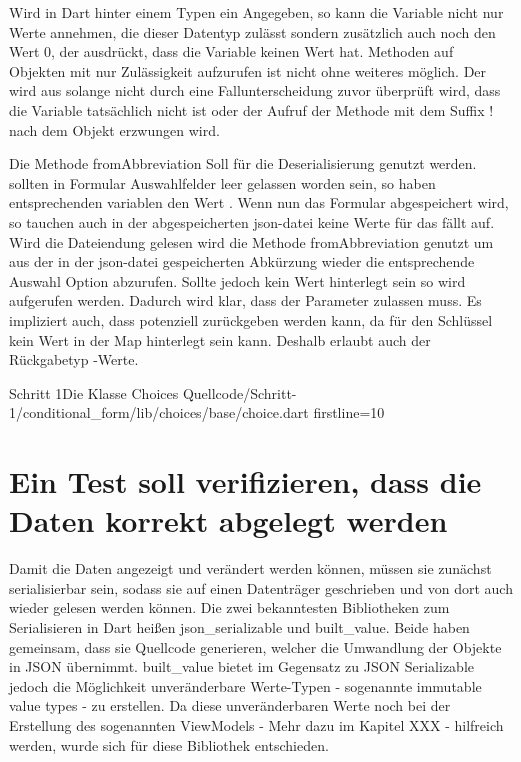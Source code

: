 Wird in Dart hinter einem Typen ein  Angegeben, so kann die Variable nicht nur  Werte annehmen, die dieser Datentyp zulässt sondern zusätzlich auch noch den Wert 0, der  ausdrückt, dass die Variable keinen Wert hat. Methoden auf Objekten mit nur Zulässigkeit aufzurufen ist nicht ohne weiteres möglich.  Der wird aus  solange nicht durch eine Fallunterscheidung zuvor überprüft wird, dass die Variable tatsächlich nicht  ist oder der Aufruf der Methode  mit dem Suffix !  nach dem Objekt erzwungen wird.

Die Methode fromAbbreviation Soll für die Deserialisierung genutzt werden.  sollten in Formular Auswahlfelder leer gelassen worden sein, so haben  entsprechenden variablen den Wert . Wenn nun das Formular abgespeichert wird, so tauchen auch in der abgespeicherten json-datei keine  Werte für das fällt auf. Wird die Dateiendung gelesen wird die Methode fromAbbreviation  genutzt um aus der in der json-datei gespeicherten Abkürzung wieder die entsprechende Auswahl Option abzurufen.  Sollte jedoch kein Wert hinterlegt sein so wird  aufgerufen werden. Dadurch wird klar, dass der Parameter  zulassen muss. Es impliziert auch, dass potenziell  zurückgeben werden kann, da für den Schlüssel  kein Wert in der Map hinterlegt sein kann. Deshalb  erlaubt auch der Rückgabetyp -Werte.




\begin{alexlisting}{Schritt 1}{Die Klasse Choices}
  {Quellcode/Schritt-1/conditional_form/lib/choices/base/choice.dart}
  {firstline=10}
  \label{lst:Schritt1KlasseChoices}
\end{alexlisting}




\section{Ein Test soll verifizieren, dass die Daten korrekt abgelegt werden}



Damit die Daten angezeigt und verändert werden können, müssen sie zunächst serialisierbar sein, sodass sie auf einen Datenträger geschrieben und von dort auch wieder gelesen werden können.
Die zwei bekanntesten Bibliotheken zum Serialisieren in Dart heißen json_serializable und built_value.
Beide haben gemeinsam, dass sie Quellcode generieren, welcher die Umwandlung der Objekte in JSON übernimmt.
built_value bietet im Gegensatz zu JSON Serializable jedoch die Möglichkeit unveränderbare Werte-Typen -  sogenannte immutable value types -  zu erstellen. Da diese  unveränderbaren Werte noch bei der Erstellung des sogenannten ViewModels -  Mehr dazu im Kapitel XXX - hilfreich werden, wurde sich für diese Bibliothek entschieden.

